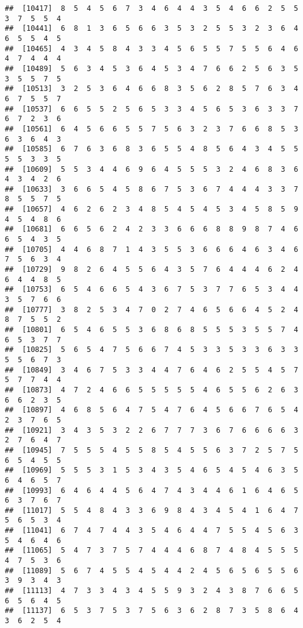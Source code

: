 \documentclass[
]{book}
\begin{document}
\begin{verbatim}
##  [10417]  8  5  4  5  6  7  3  4  6  4  4  3  5  4  6  6  2  5  5  3  7  5  5  4
##  [10441]  6  8  1  3  6  5  6  6  3  5  3  2  5  5  3  2  3  6  4  6  5  5  4  5
##  [10465]  4  3  4  5  8  4  3  3  4  5  6  5  5  7  5  5  6  4  6  4  7  4  4  4
##  [10489]  5  6  3  4  5  3  6  4  5  3  4  7  6  6  2  5  6  3  5  3  5  5  7  5
##  [10513]  3  2  5  3  6  4  6  6  8  3  5  6  2  8  5  7  6  3  4  6  7  5  5  7
##  [10537]  6  6  5  5  2  5  6  5  3  3  4  5  6  5  3  6  3  3  7  6  7  2  3  6
##  [10561]  6  4  5  6  6  5  5  7  5  6  3  2  3  7  6  6  8  5  3  6  3  6  4  3
##  [10585]  6  7  6  3  6  8  3  6  5  5  4  8  5  6  4  3  4  5  5  5  5  3  3  5
##  [10609]  5  5  3  4  4  6  9  6  4  5  5  5  3  2  4  6  8  3  6  4  3  4  2  6
##  [10633]  3  6  6  5  4  5  8  6  7  5  3  6  7  4  4  4  3  3  7  8  5  5  7  5
##  [10657]  4  6  2  6  2  3  4  8  5  4  5  4  5  3  4  5  8  5  9  4  5  4  8  6
##  [10681]  6  6  5  6  2  4  2  3  3  6  6  6  8  8  9  8  7  4  6  6  5  4  3  5
##  [10705]  4  4  6  8  7  1  4  3  5  5  3  6  6  6  4  6  3  4  6  7  5  6  3  4
##  [10729]  9  8  2  6  4  5  5  6  4  3  5  7  6  4  4  4  6  2  4  6  4  4  8  5
##  [10753]  6  5  4  6  6  5  4  3  6  7  5  3  7  7  6  5  3  4  4  3  5  7  6  6
##  [10777]  3  8  2  5  3  4  7  0  2  7  4  6  5  6  6  4  5  2  4  8  7  5  5  2
##  [10801]  6  5  4  6  5  5  3  6  8  6  8  5  5  5  3  5  5  7  4  6  5  3  7  7
##  [10825]  5  6  5  4  7  5  6  6  7  4  5  3  3  5  3  3  6  3  3  5  5  6  7  3
##  [10849]  3  4  6  7  5  3  3  4  4  7  6  4  6  2  5  5  4  5  7  5  7  7  4  4
##  [10873]  4  7  2  4  6  6  5  5  5  5  5  4  6  5  5  6  2  6  3  6  6  2  3  5
##  [10897]  4  6  8  5  6  4  7  5  4  7  6  4  5  6  6  7  6  5  4  2  3  7  6  5
##  [10921]  3  4  3  5  3  2  2  6  7  7  7  3  6  7  6  6  6  6  3  2  7  6  4  7
##  [10945]  7  5  5  5  4  5  5  8  5  4  5  5  6  3  7  2  5  7  5  6  5  4  5  5
##  [10969]  5  5  5  3  1  5  3  4  3  5  4  6  5  4  5  4  6  3  5  6  4  6  5  7
##  [10993]  6  4  6  4  4  5  6  4  7  4  3  4  4  6  1  6  4  6  5  6  3  7  6  7
##  [11017]  5  5  4  8  4  3  3  6  9  8  4  3  4  5  4  1  6  4  7  5  6  5  3  4
##  [11041]  6  7  4  7  4  4  3  5  4  6  4  4  7  5  5  4  5  6  3  5  4  6  4  6
##  [11065]  5  4  7  3  7  5  7  4  4  4  6  8  7  4  8  4  5  5  5  4  7  5  3  6
##  [11089]  5  6  7  4  5  5  4  5  4  4  2  4  5  6  5  6  5  5  6  3  9  3  4  3
##  [11113]  4  7  3  3  4  3  4  5  5  9  3  2  4  3  8  7  6  6  5  6  5  6  4  5
##  [11137]  6  5  3  7  5  3  7  5  6  3  6  2  8  7  3  5  8  6  4  3  6  2  5  4

\end{verbatim}
\end{document}
